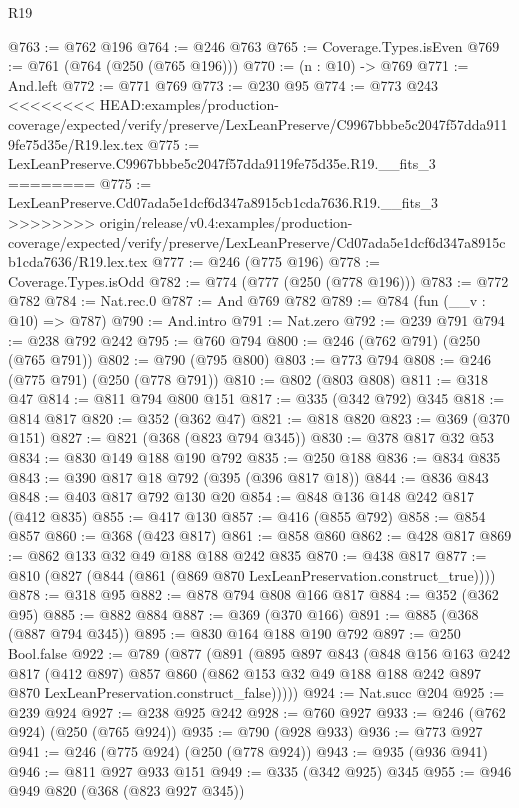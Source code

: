 \begin{lexlean}{R19}
\begin{coremodule}
{{{{{{{{{{{{{{@763 := @762 @196
@764 := @246 @763
@765 := Coverage.Types.isEven
@769 := @761 (@764 (@250 (@765 @196)))
@770 := (n : @10) -> @769
@771 := And.left
@772 := @771 @769
@773 := @230 @95
@774 := @773 @243
<<<<<<<< HEAD:examples/production-coverage/expected/verify/preserve/LexLeanPreserve/C9967bbbe5c2047f57dda9119fe75d35e/R19.lex.tex
@775 := LexLeanPreserve.C9967bbbe5c2047f57dda9119fe75d35e.R19.__fits_3
========
@775 := LexLeanPreserve.Cd07ada5e1dcf6d347a8915cb1cda7636.R19.__fits_3
>>>>>>>> origin/release/v0.4:examples/production-coverage/expected/verify/preserve/LexLeanPreserve/Cd07ada5e1dcf6d347a8915cb1cda7636/R19.lex.tex
@777 := @246 (@775 @196)
@778 := Coverage.Types.isOdd
@782 := @774 (@777 (@250 (@778 @196)))
@783 := @772 @782
@784 := Nat.rec.{0}
@787 := And @769 @782
@789 := @784 (fun (__v : @10) => @787)
@790 := And.intro
@791 := Nat.zero
@792 := @239 @791
@794 := @238 @792 @242
@795 := @760 @794
@800 := @246 (@762 @791) (@250 (@765 @791))
@802 := @790 (@795 @800)
@803 := @773 @794
@808 := @246 (@775 @791) (@250 (@778 @791))
@810 := @802 (@803 @808)
@811 := @318 @47
@814 := @811 @794 @800 @151
@817 := @335 (@342 @792) @345
@818 := @814 @817
@820 := @352 (@362 @47)
@821 := @818 @820
@823 := @369 (@370 @151)
@827 := @821 (@368 (@823 @794 @345))
@830 := @378 @817 @32 @53
@834 := @830 @149 @188 @190 @792
@835 := @250 @188
@836 := @834 @835
@843 := @390 @817 @18 @792 (@395 (@396 @817 @18))
@844 := @836 @843
@848 := @403 @817 @792 @130 @20
@854 := @848 @136 @148 @242 @817 (@412 @835)
@855 := @417 @130
@857 := @416 (@855 @792)
@858 := @854 @857
@860 := @368 (@423 @817)
@861 := @858 @860
@862 := @428 @817
@869 := @862 @133 @32 @49 @188 @188 @242 @835
@870 := @438 @817
@877 := @810 (@827 (@844 (@861 (@869 @870 LexLeanPreservation.construct_true))))
@878 := @318 @95
@882 := @878 @794 @808 @166 @817
@884 := @352 (@362 @95)
@885 := @882 @884
@887 := @369 (@370 @166)
@891 := @885 (@368 (@887 @794 @345))
@895 := @830 @164 @188 @190 @792
@897 := @250 Bool.false
@922 := @789
    (@877
      (@891
        (@895
          @897
          @843
          (@848
            @156
            @163
            @242
            @817
            (@412 @897)
            @857
            @860
            (@862 @153 @32 @49 @188 @188 @242 @897 @870 LexLeanPreservation.construct_false)))))
@924 := Nat.succ @204
@925 := @239 @924
@927 := @238 @925 @242
@928 := @760 @927
@933 := @246 (@762 @924) (@250 (@765 @924))
@935 := @790 (@928 @933)
@936 := @773 @927
@941 := @246 (@775 @924) (@250 (@778 @924))
@943 := @935 (@936 @941)
@946 := @811 @927 @933 @151
@949 := @335 (@342 @925) @345
@955 := @946 @949 @820 (@368 (@823 @927 @345))
}}}}}}}}}}}}}}
\end{coremodule}
\end{lexlean}
